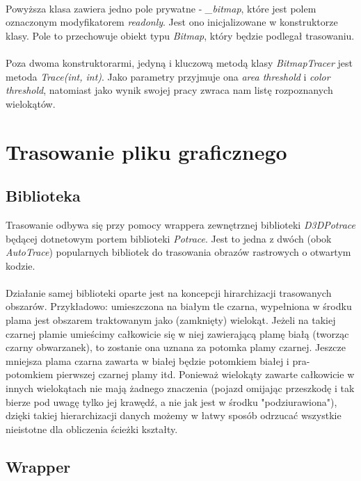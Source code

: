 \documentclass{article}
\let\oldsection\section
\renewcommand\section{\clearpage\oldsection} %
\begin{document}
~\\Powyższa klasa zawiera jedno pole prywatne - \textit{\_bitmap}, które jest polem oznaczonym modyfikatorem \textit{readonly}. Jest ono inicjalizowane w konstruktorze klasy. Pole to przechowuje obiekt typu \textit{Bitmap}, który będzie podlegał trasowaniu.
\\\\Poza dwoma konstruktorarmi, jedyną i kluczową metodą klasy \textit{BitmapTracer} jest metoda \textit{Trace(int, int)}. Jako parametry przyjmuje ona \textit{area threshold} i \textit{color threshold}, natomiast jako wynik swojej pracy zwraca nam listę rozpoznanych wielokątów.

\section{Trasowanie pliku graficznego}

\subsection{Biblioteka}

Trasowanie odbywa się przy pomocy wrappera zewnętrznej biblioteki \textit{D3DPotrace} będącej dotnetowym portem biblioteki \textit{Potrace}. Jest to jedna z dwóch (obok \textit{AutoTrace}) popularnych bibliotek do trasowania obrazów rastrowych o otwartym kodzie. 
\\\\Działanie samej biblioteki oparte jest na koncepcji hirarchizacji trasowanych obszarów. Przykładowo: umieszczona na białym tle czarna, wypełniona w środku plama jest obszarem traktowanym jako (zamknięty) wielokąt. Jeżeli na takiej czarnej plamie umieścimy całkowicie się w niej zawierającą plamę białą (tworząc czarny obwarzanek), to zostanie ona uznana za potomka plamy czarnej. Jeszcze mniejsza plama czarna zawarta w białej będzie potomkiem białej i pra-potomkiem pierwszej czarnej plamy itd. 
Ponieważ wielokąty zawarte całkowicie w innych wielokątach nie mają żadnego znaczenia (pojazd omijając przeszkodę i tak bierze pod uwagę tylko jej krawędź, a nie jak jest w środku "podziurawiona"), dzięki takiej hierarchizacji danych możemy w łatwy sposób odrzucać wszystkie nieistotne dla obliczenia ścieżki kształty.

\subsection{Wrapper}
\end{document}
